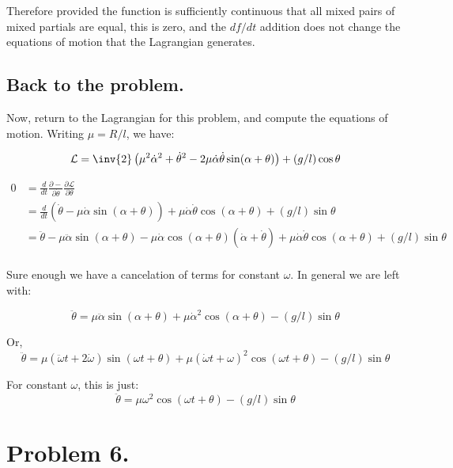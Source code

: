 \documentclass{article}
\newcommand{\LL}[0]{\mathcal{L}}
\newcommand{\dotalpha}[0]{\dot{\alpha}}
\newcommand{\ddotalpha}[0]{\ddot{\alpha}}
\newcommand{\dotomega}[0]{\dot{\omega}}
\newcommand{\ddotomega}[0]{\ddot{\omega}}
\newcommand{\dottheta}[0]{\dot{\theta}}
\newcommand{\ddottheta}[0]{\ddot{\theta}}
\newcommand{\PD}[2]{\frac{\partial {#2}}{\partial {#1}}}
\begin{document}
Therefore provided the function is sufficiently continuous that all mixed pairs of mixed partials are equal, this is zero, and the $df/dt$ addition does not 
change the equations of motion that the Lagrangian generates.

\subsection{ Back to the problem. }

Now, return to the Lagrangian for this problem, and compute the equations of motion.  Writing $\mu = R/l$, we have:

\begin{equation*}
\LL = \inv{2} \left( \mu^2 \dotalpha^2 + \dottheta^2 - 2 \mu \dotalpha \dottheta \sin( \alpha +\theta ) \right) + (g/l) \cos\theta
\end{equation*}

\begin{align*}
0 &= \frac{d}{dt}\PD{\dottheta} -\PD{\theta} \LL \\
&= \frac{d}{dt} \left(\dottheta - \mu \dotalpha \sin(\alpha + \theta)\right) + \mu \dotalpha \dottheta \cos(\alpha + \theta) + (g/l) \sin\theta \\
&= \ddottheta - \mu \ddotalpha \sin(\alpha + \theta) - \mu \dotalpha \cos(\alpha + \theta) (\dotalpha + \dottheta) + \mu \dotalpha \dottheta \cos(\alpha + \theta) + (g/l) \sin\theta \\
\end{align*}

Sure enough we have a cancelation of terms for constant $\omega$.  In general we are left with:

\begin{equation*}
\ddottheta = \mu \ddotalpha \sin(\alpha + \theta) + \mu \dotalpha^2 \cos(\alpha + \theta) - (g/l) \sin\theta
\end{equation*}

Or,
\begin{equation*}
\ddottheta = \mu (\ddotomega t + 2\dotomega) \sin(\omega t + \theta) + \mu (\dotomega t + \omega)^2 \cos(\omega t + \theta) - (g/l) \sin\theta
\end{equation*}

For constant $\omega$, this is just:
\begin{equation*}
\ddottheta = \mu \omega^2 \cos(\omega t + \theta) - (g/l) \sin\theta
\end{equation*}

\section{ Problem 6. }
\end{document}

